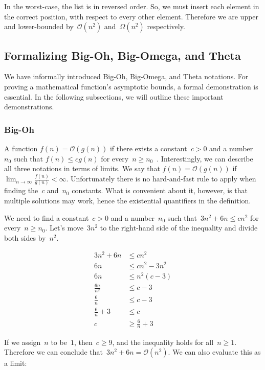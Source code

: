 In the worst-case, the list is in reversed order. 
So, we must insert each element in the correct position, with respect to every other element. 
Therefore we are upper and lower-bounded by~$\mathcal{O}(n^2)$ and~$\Omega(n^2)$ respectively.

\subsection{Formalizing Big-Oh, Big-Omega, and Theta}
We have informally introduced Big-Oh, Big-Omega, and Theta notations. 
For proving a mathematical function's asymptotic bounds, a formal demonstration is essential. 
In the following subsections, we will outline these important demonstrations.

\subsubsection*{Big-Oh}
A function $f(n) = \mathcal{O}(g(n))$ if there exists a constant~$c > 0$ and a number~$n_0$ such that $f(n) \leq cg(n)$ for every~$n \geq n_0$~. 
Interestingly, we can describe all three notations in terms of limits. 
We say that $f(n) = \mathcal{O}(g(n))$ if $\lim_{n \to \infty} \frac{f(n)}{g(n)} < \infty$. 
Unfortunately there is no hard-and-fast rule to apply when finding the~$c$ and~$n_0$ constants. 
What is convenient about it, however, is that multiple solutions may work, hence the existential quantifiers in the definition.

We need to find a constant~$c > 0$ and a number~$n_0$ such that~$3n^2 + 6n \leq cn^2$ for every~$n \geq n_0$. 
Let's move~$3n^2$ to the right-hand side of the inequality and divide both sides by~$n^2$.

\begin{align*}
  3n^2 + 6n &\leq cn^2\\
  6n &\leq cn^2 - 3n^2\\
  6n &\leq n^2(c - 3)\\
  \frac{6n}{n^2} &\leq c - 3\\
  \frac{6}{n} &\leq c - 3\\
  \frac{6}{n} + 3 &\leq c\\
  c &\geq \frac{6}{n} + 3
\end{align*}

If we assign~$n$ to be~$1$, then~$c \geq 9$, and the inequality holds for all~$n \geq 1$. Therefore we can conclude that~$3n^2 + 6n = \mathcal{O}(n^2)$. We can also evaluate this as a limit:

